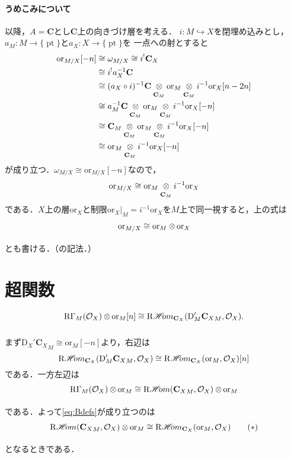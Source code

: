 \documentclass[uplatex,dvipdfmx,a4paper,10pt]{jsarticle}
\makeatletter
\theoremstyle{definition}
\newcommand{\cc}{\mathbf{C}}
\newcommand{\mcal}{\mathcal}
\renewenvironment{proof}[1][\proofname]{\par
  \pushQED{\qed}%
  \normalfont \topsep6\p@\@plus6\p@\relax
  \trivlist
  \item[\hskip\labelsep
         \bfseries
    {#1}]\ignorespaces
}{%
  \popQED\endtrivlist\@endpefalse
}
\renewcommand{\proofname}{証明.}
\numberwithin{equation}{section}
\newcommand{\pt}{\mathop{\mathrm{pt}}\nolimits}
\newcommand{\cO}{\mcal{O}}
\newcommand{\HOM}{\mathop{\mathscr{H}\hspace{-2pt}om}\nolimits}%
\newcommand{\RHOM}{\mathop{\mathrm{R}\hspace{-1.5pt}\HOM}\nolimits}
\newcommand{\RG}{\mathop{\mathrm{R}\hspace{-0pt}\Gamma}\nolimits}
\newcommand{\rmD}{\mathrm{D}}
\newcommand{\ori}{\mathord{\mathrm{or}}}
\newcommand{\tens}[1][]{\mathbin{\otimes_{\raise1.5ex\hbox to-.1em{}{#1}}}}
\newcommand{\ttens}[1][]{\mathbin{\mathop{\overset{\mathrm{}}{\tens}}_{#1}}}
\newcommand{\mres}[2][]{{\left.{#1}\right\rvert}_{#2}}
\theoremstyle{mystyle}
\makeatother
\begin{document}
\paragraph{うめこみについて}
以降，\(A=\cc\)とし\(\cc\)上の向きづけ層を考える．
\(i\colon M\hookrightarrow X\)を閉埋め込みとし，
\(a_M\colon M\to\{\pt\}\)と\(a_X\colon X\to\{\pt\}\)を
一点への射とすると
\begin{align*}
    \ori_{M/X}[-n]
    &\cong \omega_{M/X} \cong i^{!}\cc_X\\
    &\cong i^{!}a_{X}^{-1}\cc\\
    &\cong (a_{X}\circ i)^{-1}\cc\ttens[\cc_M]\ori_{M}\ttens[\cc_M]i^{-1}\ori_{X}[n-2n]\\
    &\cong a_{M}^{-1}\cc\ttens[\cc_M]\ori_{M}\ttens[\cc_M]i^{-1}\ori_{X}[-n]\\
    &\cong \cc_{M}\ttens[\cc_M]\ori_{M}\ttens[\cc_M]i^{-1}\ori_{X}[-n]\\
    &\cong \ori_{M}\ttens[\cc_M]i^{-1}\ori_{X}[-n]
\end{align*}
が成り立つ．\(\omega_{M/X}\cong\ori_{M/X}[-n]\)なので，
\begin{equation}\label{eq:rel-ori1}
    \ori_{M/X}\cong \ori_{M}\ttens[\cc_M]i^{-1}\ori_{X}    
\end{equation}
である．\(X\)上の層\(\ori_X\)と制限\(
    \mres[\ori_{X}]{M}=i^{-1}\ori_{X}
\)を\(M\)上で同一視すると，上の式は
\begin{equation}\label{eq:rel-ori2}
    \ori_{M/X}\cong \ori_{M}\ttens \ori_{X}    
\end{equation}
とも書ける．（\cite[p.130]{KS90}の記法．）

\section{超関数}
\begin{equation}\label{eq:Bdefs}
    \RG_{M}(\cO_X)\ttens[]\ori_{M}[n]
    \cong 
    \RHOM_{\cc_X}(\rmD'_{M}{\cc_X}_M,\cO_X).
\end{equation}
\begin{proof}
    まず\(\rmD_{X}'{\cc_X}_{M}\cong\ori_{M}[-n]\)より，右辺は\[
        \RHOM_{\cc_X}(\rmD'_{M}{\cc_X}_M,\cO_X)
        \cong
        \RHOM_{\cc_X}(\ori_{M},\cO_X)[n]
    \]
    である．一方左辺は
    \[
        \RG_{M}(\cO_X)\ttens[]\ori_{M}
        \cong
        \RHOM({\cc_{X}}_{M},\cO_X)\ttens[]\ori_{M}
    \]である．よって\eqref{eq:Bdefs}が成り立つのは\[
        \RHOM({\cc_{X}}_{M},\cO_X)\ttens[]\ori_{M}
        \cong 
        \RHOM_{\cc_X}(\ori_{M},\cO_X)\tag{\(\ast\)}\label{eq:goal}
    \]となるときである．
\end{proof}
\end{document}
